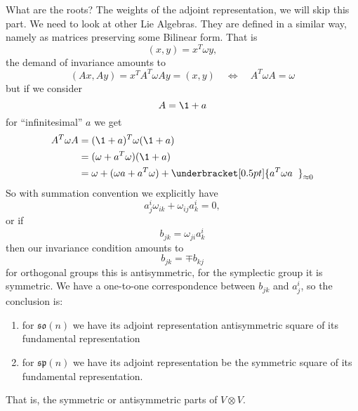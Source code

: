 What are the roots? The weights of the adjoint representation, we
will skip this part. We need to look at other Lie Algebras. They
are defined in a similar way, namely as matrices preserving some
Bilinear form. That is
\begin{equation}
(x,y)=x^{T}\omega y,
\end{equation}
the demand of invariance amounts to
\begin{equation}
(Ax,Ay)=x^{T}A^{T}\omega Ay = (x,y)\quad\iff\quad A^{T}\omega A=\omega
\end{equation}
but if we consider
\begin{equation}
A = \1 + a
\end{equation}
for ``infinitesimal'' $a$ we get
\begin{subequations}
\begin{align}
A^{T}\omega A &= (\1+a)^{T}\omega(\1+a)\\
&= (\omega + a^{T}\omega)(\1+a)\\
&=\omega + (\omega a+a^{T}\omega) +
\underbracket[0.5pt]{a^{T}\omega a\;\;}_{\approx 0}
\end{align}
\end{subequations}
So with summation convention we explicitly have
\begin{equation}
a^{i}_{j}\omega_{ik}+\omega_{ij}a^{i}_{k}=0,
\end{equation}
or if
\begin{equation}
b_{jk} = \omega_{ji}a^{i}_{k}
\end{equation}
then our invariance condition amounts to
\begin{equation}
b_{jk}=\mp b_{kj}
\end{equation}
for orthogonal groups this is antisymmetric, for the symplectic
group it is symmetric.
We have a one-to-one correspondence between $b_{jk}$ and
$a^{i}_{j}$, so the conclusion is:
\begin{enumerate}
\item for $\mathfrak{so}(n)$ we have its adjoint representation
  antisymmetric square of its fundamental representation
\item for $\mathfrak{sp}(n)$ we have its adjoint representation
  be the symmetric square of its fundamental representation.
\end{enumerate}
That is, the symmetric or antisymmetric parts of $V\otimes V$.
